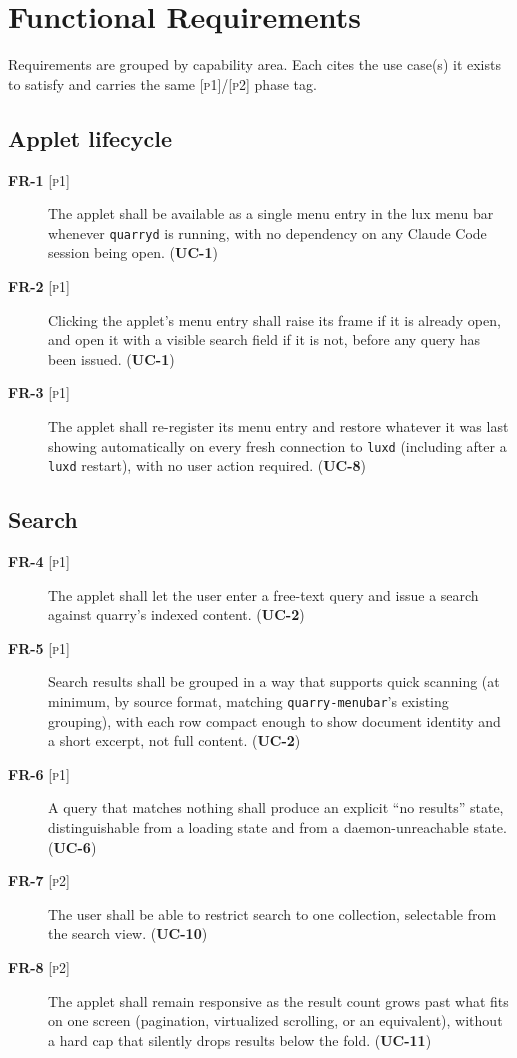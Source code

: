 \documentclass[a4paper,11pt]{report}
\newcommand{\uc}[1]{\textbf{UC-#1}}
\newcommand{\fr}[1]{\textbf{FR-#1}}
\newcommand{\pone}{\textsc{[p1]}}
\newcommand{\ptwo}{\textsc{[p2]}}
\begin{document}
\section{Functional Requirements}
\label{sec:fr}

Requirements are grouped by capability area. Each cites the use case(s) it
exists to satisfy and carries the same \pone{}/\ptwo{} phase tag.

\subsection{Applet lifecycle}

\begin{description}
  \item[\fr{1} \pone{}] The applet shall be available as a single menu
    entry in the lux menu bar whenever \texttt{quarryd} is running, with
    no dependency on any Claude Code session being open. (\uc{1})
  \item[\fr{2} \pone{}] Clicking the applet's menu entry shall raise its
    frame if it is already open, and open it with a visible search field
    if it is not, before any query has been issued. (\uc{1})
  \item[\fr{3} \pone{}] The applet shall re-register its menu entry and
    restore whatever it was last showing automatically on every fresh
    connection to \texttt{luxd} (including after a \texttt{luxd} restart),
    with no user action required. (\uc{8})
\end{description}

\subsection{Search}

\begin{description}
  \item[\fr{4} \pone{}] The applet shall let the user enter a free-text
    query and issue a search against quarry's indexed content. (\uc{2})
  \item[\fr{5} \pone{}] Search results shall be grouped in a way that
    supports quick scanning (at minimum, by source format, matching
    \texttt{quarry-menubar}'s existing grouping), with each row compact
    enough to show document identity and a short excerpt, not full
    content. (\uc{2})
  \item[\fr{6} \pone{}] A query that matches nothing shall produce an
    explicit ``no results'' state, distinguishable from a loading state
    and from a daemon-unreachable state. (\uc{6})
  \item[\fr{7} \ptwo{}] The user shall be able to restrict search to one
    collection, selectable from the search view. (\uc{10})
  \item[\fr{8} \ptwo{}] The applet shall remain responsive as the result
    count grows past what fits on one screen (pagination, virtualized
    scrolling, or an equivalent), without a hard cap that silently drops
    results below the fold. (\uc{11})
\end{description}
\end{document}
